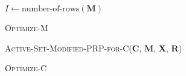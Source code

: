 
\begin{algorithm}[h]
$I \gets \text{number-of-rows}(\textbf{M})$\;
\caption{\textsc{Optimize-M}}
\label{alg:opt-M}
\end{algorithm}

\begin{algorithm}[h]
\textsc{Active-Set-Modified-PRP-for-C}(\textbf{C}, \textbf{M}, \textbf{X}, \textbf{R})\;
\caption{\textsc{Optimize-C}}
\label{alg:opt-C}
\end{algorithm}

